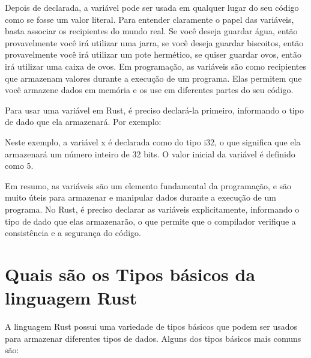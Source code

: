 \documentclass[12pt,a4paper,oneside]{abntex2}
\begin{document}
Depois de declarada, a variável pode ser usada em qualquer lugar do seu código como se fosse um valor literal. Para entender claramente o papel das variáveis, basta associar os recipientes do mundo real. Se você deseja guardar água, então provavelmente você irá utilizar uma jarra, se você deseja guardar biscoitos, então provavelmente você irá utilizar um pote hermético, se quiser guardar ovos, então irá utilizar uma caixa de ovos. 
Em programação, as variáveis são como recipientes que armazenam valores durante a execução de um programa. Elas permitem que você armazene dados em memória e os use em diferentes partes do seu código.

Para usar uma variável em Rust, é preciso declará-la primeiro, informando o tipo de dado que ela armazenará. Por exemplo:

%

Neste exemplo, a variável x é declarada como do tipo i32, o que significa que ela armazenará um número inteiro de 32 bits. O valor inicial da variável é definido como 5.


%

Em resumo, as variáveis são um elemento fundamental da programação, e são muito úteis para armazenar e manipular dados durante a execução de um programa. No Rust, é preciso declarar as variáveis explicitamente, informando o tipo de dado que elas armazenarão, o que permite que o compilador verifique a consistência e a segurança do código.

\section{Quais são os Tipos básicos da linguagem Rust}

A linguagem Rust possui uma variedade de tipos básicos que podem ser usados para armazenar diferentes tipos de dados. Alguns dos tipos básicos mais comuns são:
\end{document}
